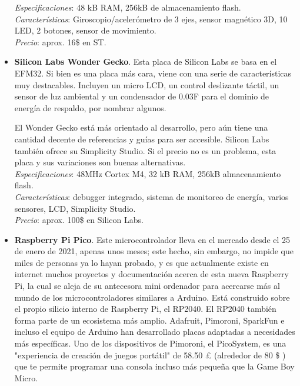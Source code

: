 \documentclass[12pt]{article}
\begin{document}
\begin{itemize}
		\textit{Especificaciones}: 48 kB RAM, 256kB de almacenamiento flash.\\
		
		\textit{Características}: Giroscopio/acelerómetro de 3 ejes, sensor magnético 3D, 10 LED, 2 botones, sensor de movimiento.\\
		
		\textit{Precio}: aprox. 16\$ en ST.
		\\
		
		\item \textbf{Silicon Labs Wonder Gecko}. Esta placa de Silicon Labs se basa en el EFM32. Si bien es una placa más cara, viene con una serie de características muy destacables. Incluyen un micro LCD, un control deslizante táctil, un sensor de luz ambiental y un condensador de 0.03F para el dominio de energía de respaldo, por nombrar algunos.
		
		El Wonder Gecko está más orientado al desarrollo, pero aún tiene una cantidad decente de referencias y guías para ser accesible. Silicon Labs también ofrece su Simplicity Studio. Si el precio no es un problema, esta placa y sus variaciones son buenas alternativas. \\
		
		\textit{Especificaciones}: 48MHz Cortex M4, 32 kB RAM, 256kB almacenamiento flash.\\
		
		\textit{Características}: debugger integrado, sistema de monitoreo de energía, varios sensores, LCD, Simplicity Studio.\\
		
		\textit{Precio}: aprox.  100\$ en Silicon Labs.\\
		
		\item \textbf{Raspberry Pi Pico}. Este microcontrolador lleva en el mercado desde el 25 de enero de 2021, apenas unos meses; este hecho, sin embargo, no impide que miles de personas ya lo hayan probado, y es que actualmente existe en internet muchos proyectos y documentación acerca de esta nueva Raspberry Pi, la cual se aleja de su antecesora mini ordenador para acercarse más al mundo de los microcontroladores similares a Arduino. Está construido sobre el propio silicio interno de Raspberry Pi, el RP2040. El RP2040 también forma parte de un ecosistema más amplio. Adafruit, Pimoroni, SparkFun e incluso el equipo de Arduino han desarrollado placas adaptadas a necesidades más específicas. Uno de los dispositivos de Pimoroni, el PicoSystem, es una "experiencia de creación de juegos portátil" de 58.50 £ (alrededor de 80 \$ ) que te permite programar una consola incluso más pequeña que la Game Boy Micro.\\
		

\end{itemize}
\end{document}
